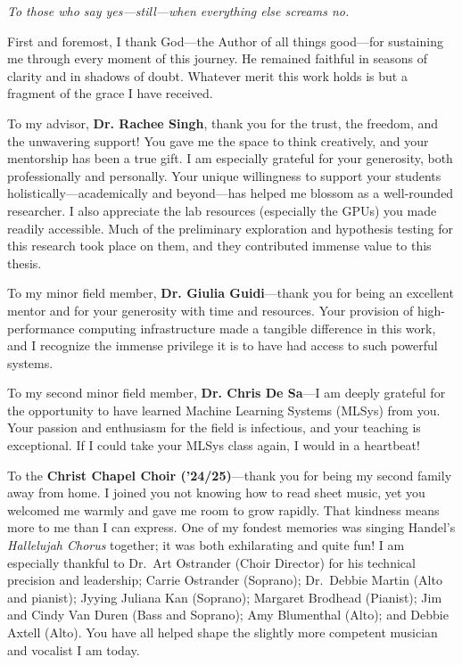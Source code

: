\begin{dedication}
    \textit{To those who say yes—still—when everything else screams no.}
\end{dedication}

\begin{acknowledgements}
    First and foremost, I thank God—the Author of all things good—for sustaining me through every moment of this journey.
    He remained faithful in seasons of clarity and in shadows of doubt.
    Whatever merit this work holds is but a fragment of the grace I have received.

    To my advisor, \textbf{Dr. Rachee Singh}, thank you for the trust, the freedom, and the unwavering support!
    You gave me the space to think creatively, and your mentorship has been a true gift.
    I am especially grateful for your generosity, both professionally and personally.
    Your unique willingness to support your students holistically—academically and beyond—has
    helped me blossom as a well-rounded researcher.
    I also appreciate the lab resources (especially the GPUs) you made readily accessible.
    Much of the preliminary exploration and hypothesis testing for this research took place on them,
    and they contributed immense value to this thesis.

    To my minor field member, \textbf{Dr. Giulia Guidi}—thank you for being an excellent mentor
    and for your generosity with time and resources.
    Your provision of high-performance computing infrastructure made a tangible difference in this work,
    and I recognize the immense privilege it is to have had access to such powerful systems.

    To my second minor field member, \textbf{Dr. Chris De Sa}—I am deeply grateful for the opportunity to
    have learned Machine Learning Systems (MLSys) from you.
    Your passion and enthusiasm for the field is infectious, and your teaching is exceptional.
    If I could take your MLSys class again, I would in a heartbeat!

    To the \textbf{Christ Chapel Choir (’24/25)}—thank you for being my second family away from home.
    I joined you not knowing how to read sheet music, yet you welcomed me warmly and gave me room to grow rapidly.
    That kindness means more to me than I can express.
    One of my fondest memories was singing Handel’s \textit{Hallelujah Chorus} together; it was both exhilarating
    and quite fun!
    I am especially thankful to Dr.\ Art Ostrander (Choir Director) for his technical precision and leadership;
    Carrie Ostrander (Soprano);
    Dr.\ Debbie Martin (Alto and pianist);
    Jyying Juliana Kan (Soprano);
    Margaret Brodhead (Pianist); Jim and Cindy Van Duren (Bass and Soprano);
    Amy Blumenthal (Alto); and Debbie Axtell (Alto).
    You have all helped shape the slightly more competent musician and vocalist I am today.


\end{acknowledgements}
